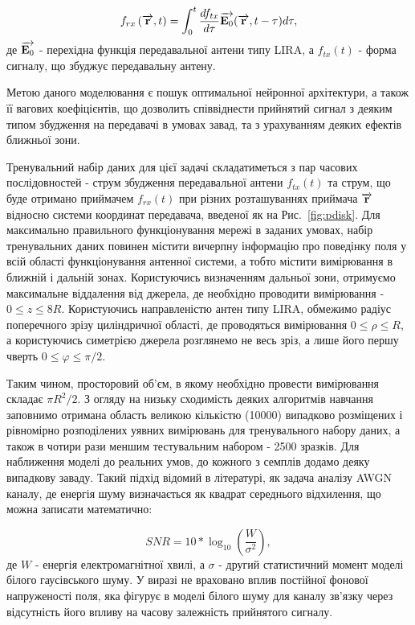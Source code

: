 \begin{equation}
f_{rx} \left( \overrightarrow{\mathbf r}, t \right) = 
\int_0^t \frac{d f_{tx}}{d \tau} \overrightarrow{\mathbf E_0} (\overrightarrow{\mathbf r}, t - \tau) d \tau,
\end{equation}
%
де $ \overrightarrow{\mathbf E_0} $ - перехідна функція передавальної антени типу LIRA, а 
$ f_{tx} (t) $ - форма сигналу, що збуджує передавальну антену.

Метою даного моделювання є пошук оптимальної нейронної архітектури, а також 
її вагових коефіцієнтів, що дозволить співвіднести прийнятий сигнал з деяким 
типом збудження на передавачі в умовах завад, та з урахуванням деяких ефектів 
ближньої зони.

Тренувальний набір даних для цієї задачі складатиметься з пар часових 
послідовностей - струм збудження передавальної антени $ f_{tx} (t) $ та струм, 
що буде отримано приймачем $ f_{rx} (t) $ при різних розташуваннях 
приймача $ \overrightarrow{\mathbf r} $ відносно системи координат передавача, введеної як на 
Рис.~\ref{fig:pdisk}. Для максимально правильного функціонування мережі в 
заданих умовах, набір тренувальних даних повинен містити вичерпну інформацію про 
поведінку поля у всій області функціонування антенної системи, а тобто містити 
вимірювання в ближній і дальній зонах. Користуючись визначенням дальньої зони,
отримуємо максимальне віддалення від джерела, де необхідно проводити 
вимірювання - $ 0 \leq z \leq 8R $. Користуючись направленістю антен типу 
LIRA, обмежимо радіус поперечного зрізу циліндричної області, де проводяться 
вимірювання $ 0 \leq \rho \leq R $, а користуючись симетрією джерела розглянемо 
не весь зріз, а лише його першу чверть $ 0 \leq \varphi \leq \pi / 2 $.

Таким чином, просторовий об'єм, в якому необхідно провести вимірювання 
складає $ \pi R^2 / 2 $. З огляду на низьку сходимість деяких алгоритмів 
навчання заповнимо отримана область великою кількістю (10000) випадково 
розміщених і рівномірно розподілених уявних вимірювань для тренувального 
набору даних, а також в чотири рази меншим тестувальним набором - 
2500 зразків. Для наближення моделі до реальних умов, до кожного з семплів 
додамо деяку випадкову заваду. Такий підхід відомий в літературі, як 
задача аналізу AWGN каналу, де енергія шуму визначається як квадрат 
середнього відхилення, що можна записати математично:

\begin{equation} \label{eq:snr}
SNR = 10 * \log_{10} \left( \frac{W}{\sigma^2} \right),
\end{equation}
%
де $ W $ - енергія електромагнітної хвилі, а $ \sigma $ - другий статистичний 
момент моделі білого гаусівського шуму. У виразі не враховано вплив постійної 
фонової напруженості поля, яка фігурує в моделі білого шуму для каналу зв'язку 
через відсутність його впливу на часову залежність прийнятого сигналу.

